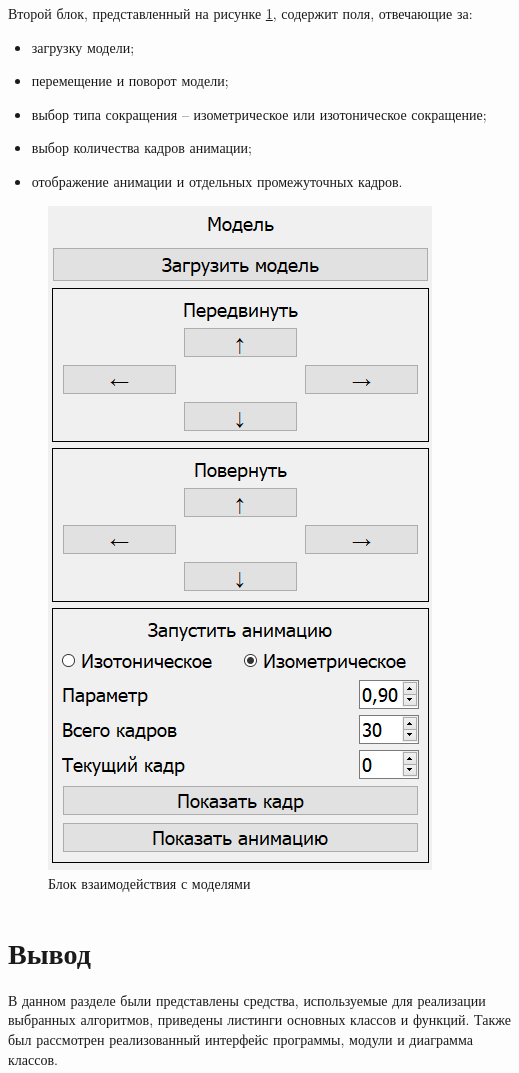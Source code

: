 Второй блок, представленный на рисунке \ref{fig:models}, содержит поля, отвечающие за:
\begin{itemize}
	\item загрузку модели;
	\item перемещение и поворот модели;
	\item выбор типа сокращения -- изометрическое или изотоническое сокращение;
	\item выбор количества кадров анимации;
	\item отображение анимации и отдельных промежуточных кадров.
\end{itemize}
\begin{figure}[H]
	\centering
	\includegraphics[width=0.4\linewidth]{images/models}
	\caption{Блок взаимодействия с моделями}
	\label{fig:models}
\end{figure}



\section{Вывод}
\label{sec:conc_impl}
В данном разделе были представлены средства, используемые для реализации выбранных алгоритмов, приведены листинги основных классов и функций. Также был рассмотрен реализованный интерфейс программы, модули и диаграмма классов.

                                                                                                                                                 